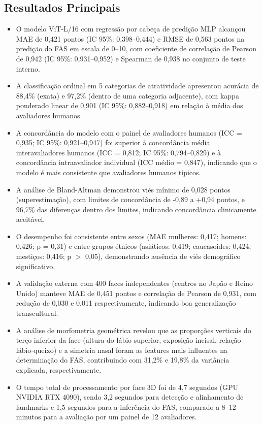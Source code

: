\subsection{Resultados Principais}
\begin{itemize}
  \item O modelo ViT-L/16 com regressão por cabeça de predição MLP
        alcançou MAE de 0,421 pontos (IC 95\%: 0,398--0,444) e RMSE
        de 0,563 pontos na predição do FAS em escala de 0--10,
        com coeficiente de correlação de Pearson de 0,942 (IC 95\%:
        0,931--0,952) e Spearman de 0,938 no conjunto de teste interno.
  \item A classificação ordinal em 5 categorias de atratividade
        apresentou acurácia de 88,4\% (exata) e 97,2\% (dentro de
        uma categoria adjacente), com kappa ponderado linear de
        0,901 (IC 95\%: 0,882--0,918) em relação à média dos
        avaliadores humanos.
  \item A concordância do modelo com o painel de avaliadores humanos
        (ICC = 0,935; IC 95\%: 0,921--0,947) foi superior à
        concordância média interavaliadores humanos (ICC = 0,812;
        IC 95\%: 0,794--0,829) e à concordância intraavaliador
        individual (ICC médio = 0,847), indicando que o modelo é
        mais consistente que avaliadores humanos típicos.
  \item A análise de Bland-Altman demonstrou viés mínimo de 0,028
        pontos (superestimação), com limites de concordância de
        -0,89 a +0,94 pontos, e 96,7\% das diferenças dentro dos
        limites, indicando concordância clinicamente aceitável.
  \item O desempenho foi consistente entre sexos (MAE mulheres:
        0,417; homens: 0,426; p = 0,31) e entre grupos étnicos
        (asiáticos: 0,419; caucasoides: 0,424; mestiços: 0,416;
        p $>$ 0,05), demonstrando ausência de viés demográfico
        significativo.
  \item A validação externa com 400 faces independentes (centros
        no Japão e Reino Unido) manteve MAE de 0,451 pontos e
        correlação de Pearson de 0,931, com redução de 0,030 e
        0,011 respectivamente, indicando boa generalização
        transcultural.
  \item A análise de morfometria geométrica revelou que as
        proporções verticais do terço inferior da face (altura do
        lábio superior, exposição incisal, relação lábio-queixo)
        e a simetria nasal foram as features mais influentes na
        determinação do FAS, contribuindo com 31,2\% e 19,8\% da
        variância explicada, respectivamente.
  \item O tempo total de processamento por face 3D foi de 4,7
        segundos (GPU NVIDIA RTX 4090), sendo 3,2 segundos para
        detecção e alinhamento de landmarks e 1,5 segundos para a
        inferência do FAS, comparado a 8--12 minutos para a
        avaliação por um painel de 12 avaliadores.
\end{itemize}

